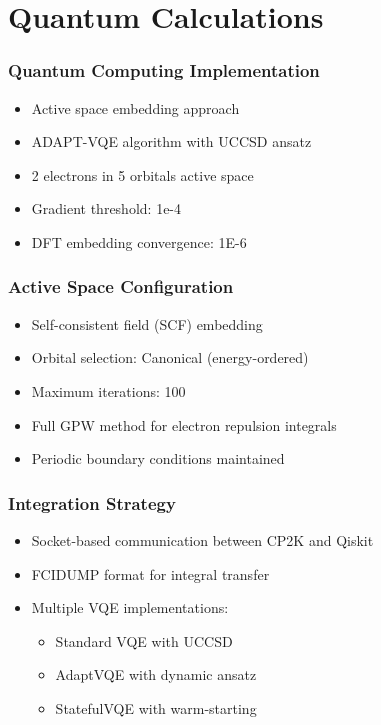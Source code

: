 \section{Quantum Calculations}

\begin{frame}
\frametitle{Quantum Computing Implementation}
\begin{itemize}
    \item Active space embedding approach
    \item ADAPT-VQE algorithm with UCCSD ansatz
    \item 2 electrons in 5 orbitals active space
    \item Gradient threshold: 1e-4
    \item DFT embedding convergence: 1E-6
\end{itemize}
\end{frame}

\begin{frame}
\frametitle{Active Space Configuration}
\begin{itemize}
    \item Self-consistent field (SCF) embedding
    \item Orbital selection: Canonical (energy-ordered)
    \item Maximum iterations: 100
    \item Full GPW method for electron repulsion integrals
    \item Periodic boundary conditions maintained
\end{itemize}
\end{frame}

\begin{frame}
\frametitle{Integration Strategy}
\begin{itemize}
    \item Socket-based communication between CP2K and Qiskit
    \item FCIDUMP format for integral transfer
    \item Multiple VQE implementations:
    \begin{itemize}
        \item Standard VQE with UCCSD
        \item AdaptVQE with dynamic ansatz
        \item StatefulVQE with warm-starting
    \end{itemize}
\end{itemize}
\end{frame}

